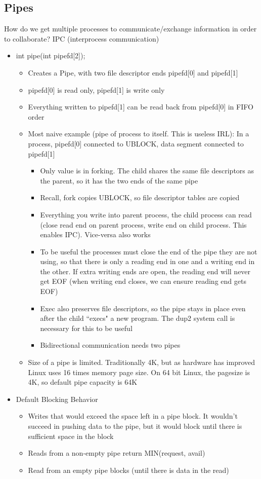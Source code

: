 \subsection{Pipes}
How do we get multiple processes to communicate/exchange information in order to collaborate? IPC (interprocess communication)
\begin{itemize}
    \item int pipe(int pipefd[2]);
    \begin{itemize}
        \item Creates a Pipe, with two file descriptor ends pipefd[0] and pipefd[1]
        \item pipefd[0] is read only, pipefd[1] is write only
        \item Everything written to pipefd[1] can be read back from pipefd[0] in FIFO order
        \item Most naive example (pipe of process to itself. This is useless IRL): In a process, pipefd[0] connected to UBLOCK, data segment connected to pipefd[1]
        \begin{itemize}
            \item Only value is in forking. The child shares the same file descriptors as the parent, so it has the two ends of the same pipe
            \item Recall, fork copies UBLOCK, so file descriptor tables are copied
            \item Everything you write into parent process, the child process can read (close read end on parent process, write end on child process. This enables IPC). Vice-versa also works
            \item To be useful the processes must close the end of the pipe they are not using, so that there is only a reading end in one and a writing end in the other. If extra writing ends are open, the reading end will never get EOF (when writing end closes, we can ensure reading end gets EOF)
            \item Exec also preserves file descriptors, so the pipe stays in place even after the child ``execs" a new program. The dup2 system call is necessary for this to be useful
            \item Bidirectional communication needs two pipes
        \end{itemize}
        \item Size of a pipe is limited. Traditionally 4K, but as hardware has improved Linux uses 16 times memory page size. On 64 bit Linux, the pagesize is 4K, so default pipe capacity is 64K
    \end{itemize}
    \item Default Blocking Behavior
    \begin{itemize}
        \item Writes that would exceed the space left in a pipe block. It wouldn't succeed in pushing data to the pipe, but it would block until there is sufficient space in the block
        \item Reads from a non-empty pipe return MIN(request, avail)
        \item Read from an empty pipe blocks (until there is data in the read)
    \end{itemize}
\end{itemize}
